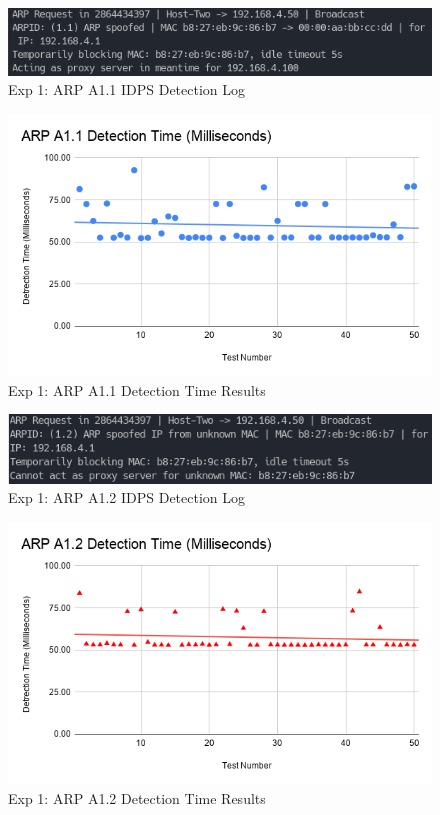 \documentclass[12pt, oneside]{book}
\begin{document}
\begin{figure}[H]
	\centering
	\includegraphics[scale=0.7]{../tests/a11/IDPSCap.png}
	\caption{Exp 1: ARP A1.1 IDPS Detection Log}
	\label{fig:arpa11l}
\end{figure}
\begin{figure}[H]
	\centering
	\includegraphics[scale=0.65]{../tests/aAll/ARP_A1.1_Detection_Time_(Milliseconds)_.png}
	\caption{Exp 1: ARP A1.1 Detection Time Results}
	\label{fig:arpa11g}
\end{figure}

\begin{figure}[H]
	\centering
	\includegraphics[scale=0.7]{../tests/a12/IDPSCap.png}
	\caption{Exp 1: ARP A1.2 IDPS Detection Log}
	\label{fig:arpa12l}
\end{figure}

\begin{figure}[H]
	\centering
	\includegraphics[scale=0.65]{../tests/aAll/ARP_A1.2_Detection_Time_(Milliseconds)_.png}
	\caption{Exp 1: ARP A1.2 Detection Time Results}
	\label{fig:arpa12g}
\end{figure}
\end{document}
